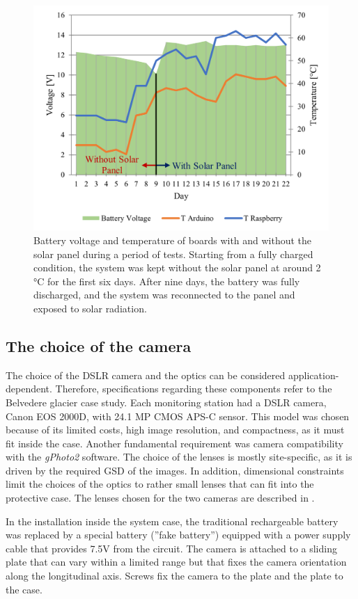\begin{figure}[ht!]
  \centering
  \includegraphics[width=.6\textwidth]{nominal.png}
  \caption{Battery voltage and temperature of boards with and without the solar panel during a period of tests. 
  Starting from a fully charged condition, the system was kept without the solar panel at around 2 °C for the first six days.
  After nine days, the battery was fully discharged, and the system was reconnected to the panel and exposed to solar radiation.}
  \label{fig:4:nominal_performance}
\end{figure}

\subsection{The choice of the camera}\label{camera}

The choice of the DSLR camera and the optics can be considered application-dependent.
Therefore, specifications regarding these components refer to the Belvedere glacier case study. 
Each monitoring station had a DSLR camera, Canon EOS 2000D, with 24.1 MP CMOS \mbox{APS-C} sensor. 
This model was chosen because of its limited costs, high image resolution, and compactness, as it must fit inside the case. 
Another fundamental requirement was camera compatibility with the \textit{gPhoto2} software. 
The choice of the lenses is mostly site-specific, as it is driven by the required GSD of the images. 
In addition, dimensional constraints limit the choices of the optics to rather small lenses that can fit into the protective case.
The lenses chosen for the two cameras are described in .

In the installation inside the system case, the traditional rechargeable battery was replaced by a special battery 
(”fake battery”) equipped with a power supply cable that provides 7.5V from the circuit. 
The camera is attached to a sliding plate that can vary within a limited range but that fixes the camera orientation along the longitudinal axis. 
Screws fix the camera to the plate and the plate to the case.

